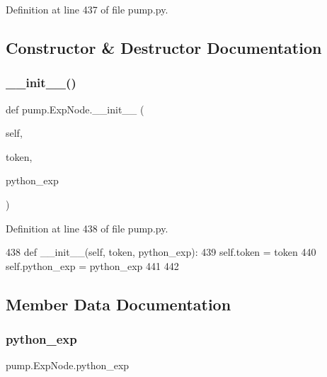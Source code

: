 Definition at line 437 of file pump.\+py.



\subsection{Constructor \& Destructor Documentation}
\mbox{\label{classpump_1_1ExpNode_a0808c394c4d3c8ac875005caa1b3e1b3}} 
\subsubsection{\texorpdfstring{\+\_\+\+\_\+init\+\_\+\+\_\+()}{\_\_init\_\_()}}
{\footnotesize\ttfamily def pump.\+Exp\+Node.\+\_\+\+\_\+init\+\_\+\+\_\+ (\begin{DoxyParamCaption}\item[{}]{self,  }\item[{}]{token,  }\item[{}]{python\+\_\+exp }\end{DoxyParamCaption})}



Definition at line 438 of file pump.\+py.


\begin{DoxyCode}
438   \textcolor{keyword}{def }\_\_init\_\_(self, token, python\_exp):
439     self.token = token
440     self.python\_exp = python\_exp
441 
442 
\end{DoxyCode}


\subsection{Member Data Documentation}
\mbox{\label{classpump_1_1ExpNode_adccfe4778c2e34f6b2c88118c0f1587f}} 
\subsubsection{\texorpdfstring{python\+\_\+exp}{python\_exp}}
{\footnotesize\ttfamily pump.\+Exp\+Node.\+python\+\_\+exp}




